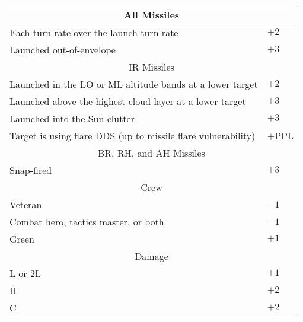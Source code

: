 \begin{onecolumntable}
{\begin{tabularx}{\linewidth}{Xl}
\toprule
\multicolumn{2}{c}{All Missiles}\\
\midrule
Each turn rate over the launch turn rate&$+2$\\
Launched out-of-envelope&$+3$\\
\midrule
\multicolumn{2}{c}{IR Missiles}\\
\midrule
Launched in the  LO or ML altitude bands at a lower target&$+2$\\
Launched above the highest cloud layer at a lower target&$+3$\\
Launched into the Sun clutter&$+3$\\
Target is using flare DDS (up to missile flare vulnerability)&$+$PPL\\
\midrule
\multicolumn{2}{c}{BR, RH, and AH Missiles}\\
\midrule
Snap-fired&$+3$\\
\midrule
\multicolumn{2}{c}{Crew}\\
\midrule
Veteran&$-1$\\
Combat hero, 
tactics master, or both&$-1$\\
Green&$+1$\\
\midrule
\multicolumn{2}{c}{Damage}\\
\midrule
L or 2L&$+1$\\
H&$+2$\\
C&$+2$\\
\bottomrule
\end{tabularx}
}

\end{onecolumntable}